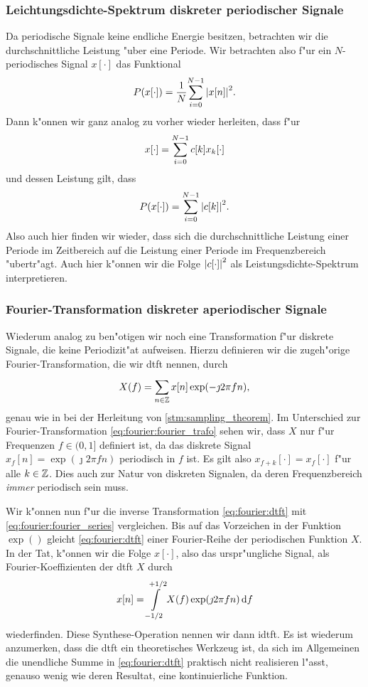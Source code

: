 \subsubsection{Leichtungsdichte-Spektrum diskreter periodischer Signale}\label{sec:fourier:disc_period_power}
%
Da periodische Signale keine endliche Energie besitzen, betrachten wir die durchschnittliche Leistung "uber eine Periode.
Wir betrachten also f"ur ein $N$-periodisches Signal $x[\cdot]$ das Funktional
\begin{equation}
    P(x[\cdot]) = \frac{1}{N}{\sum\limits_{i=0}^{N-1}{{\left| x[n] \right|}^2}}.
\end{equation}
Dann k"onnen wir ganz analog zu vorher wieder herleiten, dass f"ur
\[
x[\cdot] = {\sum\limits_{i=0}^{N-1}{c[k] x_k[\cdot]}}
\]
und dessen Leistung gilt, dass
\[
P(x[\cdot]) = {\sum\limits_{i=0}^{N-1}{{\left| c[k] \right|}^2}}.
\]
Also auch hier finden wir wieder, dass sich die durchschnittliche Leistung einer Periode im Zeitbereich auf die Leistung einer Periode im Frequenzbereich "ubertr"agt.
Auch hier k"onnen wir die Folge ${\left| c[\cdot] \right|}^2$ als Leistungsdichte-Spektrum interpretieren.
\FloatBarrier
%
\subsubsection{Fourier-Transformation diskreter aperiodischer Signale}\label{sec:fourier:disc_aperiod}
%
Wiederum analog zu  ben"otigen wir noch eine Transformation f"ur diskrete Signale, die keine Periodizit"at aufweisen.
Hierzu definieren wir die zugeh"orige Fourier-Transformation, die wir \gls{dtft} nennen, durch
\begin{equation}\label{eq:fourier:dtft}
    X(f) = {\sum\limits_{n \in \mathbb{Z}}^{}{x[n] \exp(-\jmath 2 \pi f n)}},
\end{equation}
genau wie in  bei der Herleitung von \eqref{stm:sampling_theorem}.
Im Unterschied zur  Fourier-Transformation \eqref{eq:fourier:fourier_trafo} sehen wir, dass $X$ nur f"ur Frequenzen $f \in (0,1]$ definiert ist, da das diskrete Signal $x_f[n] = \exp(\jmath 2 \pi f n)$ periodisch in $f$ ist.
Es gilt also $x_{f + k}[\cdot] = x_{f}[\cdot]$ f"ur alle $k \in \mathbb{Z}$.
Dies  auch zur Natur von diskreten Signalen, da deren Frequenzbereich \emph{immer} periodisch sein muss.

Wir k"onnen nun f"ur die inverse Transformation \eqref{eq:fourier:dtft} mit \eqref{eq:fourier:fourier_series} vergleichen. 
Bis auf das Vorzeichen in der Funktion $\exp()$ gleicht \eqref{eq:fourier:dtft} einer Fourier-Reihe der periodischen Funktion $X$.
In der Tat, k"onnen wir die Folge $x[\cdot]$, also das urspr"ungliche Signal, als Fourier-Koeffizienten der \gls{dtft} $X$ durch
\begin{equation}\label{eq:fourier:idtft}
    x[n] = {\int\limits_{-1/2}^{+1/2}{X(f)\exp(\jmath 2 \pi f n)}\,\mathrm{d}{f}}
\end{equation}
wiederfinden.
Diese Synthese-Operation nennen wir dann \gls{idtft}.
Es ist wiederum anzumerken, dass die \gls{dtft}  ein theoretisches Werkzeug ist, da sich im Allgemeinen die unendliche Summe in \eqref{eq:fourier:dtft} praktisch nicht realisieren l"asst, genauso wenig wie deren Resultat, eine kontinuierliche Funktion.

